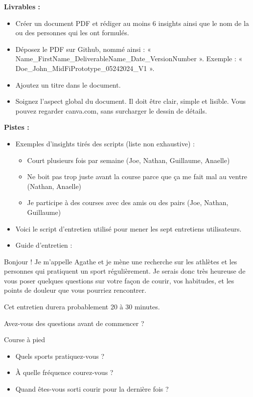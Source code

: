 \textbf{Livrables :}

\begin{itemize}
\item Créer un document PDF et rédiger au moins 6 insights ainsi que le nom de la ou des personnes qui les ont formulés.
\item Déposez le PDF sur Github, nommé ainsi : « Name\_FirstName\_DeliverableName\_Date\_VersionNumber ». Exemple : « Doe\_John\_MidFiPrototype\_05242024\_V1 ».
\item Ajoutez un titre dans le document.
\item Soignez l'aspect global du document. Il doit être clair, simple et lisible. Vous pouvez regarder canva.com, sans surcharger le dessin de détails.
\end{itemize}

\textbf{Pistes :}

\begin{itemize}
\item Exemples d'insights tirés des scripts (liste non exhaustive) :
\begin{itemize}
\item Court plusieurs fois par semaine (Joe, Nathan, Guillaume, Anaelle)
\item Ne boit pas trop juste avant la course parce que ça me fait mal au ventre (Nathan, Anaelle)
\item Je participe à des courses avec des amis ou des pairs (Joe, Nathan, Guillaume)
\end{itemize}
\end{itemize}

\begin{itemize}
\item Voici le script d'entretien utilisé pour mener les sept entretiens utilisateurs.
\item Guide d'entretien :
\end{itemize}

Bonjour ! Je m'appelle Agathe et je mène une recherche sur les athlètes et les personnes qui pratiquent un sport régulièrement. Je serais donc très heureuse de vous poser quelques questions sur votre façon de courir, vos habitudes, et les points de douleur que vous pourriez rencontrer.

Cet entretien durera probablement 20 à 30 minutes.

Avez-vous des questions avant de commencer ?

Course à pied

\begin{itemize}
\item Quels sports pratiquez-vous ?
\item À quelle fréquence courez-vous ?
\item Quand êtes-vous sorti courir pour la dernière fois ?
\end{itemize}

